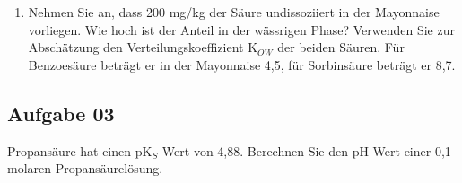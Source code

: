 \documentclass[a4paper,11pt]{article}
\newif\ifshowme
\begin{document}
\begin{enumerate}[label=\alph*)]
{}
\else
\fi

\item Nehmen Sie an, dass 200 mg/kg der Säure undissoziiert in der Mayonnaise vorliegen.
Wie hoch ist der Anteil in der wässrigen Phase? Verwenden Sie zur Abschätzung den
Verteilungskoeffizient K$_{OW}$ der beiden Säuren. Für Benzoesäure beträgt er in der
Mayonnaise 4,5, für Sorbinsäure beträgt er 8,7.

\ifshowme
\antwort{
Gibt man einen Stoff in ein System zweier nicht mischbarer Phasen, so verteilt er sich durch Diffusion,
bis sich ein Gleichgewicht eingestellt hat. Das Gleichgewicht wird durch den Nernst’schen
Verteilungskoeffizienten beschrieben:
\boxfr{
\begin{align*}
K_N = \frac{c_{p1}}{c_{p2}}
\end{align*}
}
\pp
\begin{align*}
K= 4,5 &= \frac{\frac{200~\text{mg}-x}{350}}{\frac{x}{650~\text{g}}} \\
4,5 &= \frac{200~\text{mg}-x}{350~\text{g}} \cdot \frac{650~\text{g}}{x}  \\
4,5 &= \frac{650}{350} \cdot (\frac{200~\text{mg}}{x}-1) \\ 
4,5 \cdot \frac{350}{650} &= \frac{200~\text{mg}}{x} -1 \\
(4,5 \cdot \frac{350}{650}+1) &= \frac{200~\text{mg}}{x} \\
\frac{1}{4,5 \cdot \frac{350}{650} + 1} \cdot 200 ~\text{mg} &= x  \\
x &= 58,43  ~\text{mg}
\end{align*}

Bei gleicher Verfahrensweise erhält man für \textbf{Sorbinsäure} (Verteilungskoeffizient = 8,7) einen Anteil von 35 mg in der wässrigen Phase
}
\else
\fi



\end{enumerate}
\subsection*{Aufgabe 03}
Propansäure hat einen pK$_S$-Wert von 4,88. Berechnen Sie den pH-Wert einer 0,1 molaren
Propansäurelösung.

\ifshowme
\antwort{
Formel für schwache Säuren:
\begin{align*}
pH &= \frac{1}{2} \cdot (pK_S - \log(c)) \\
pH &= \frac{1}{2} \cdot (4,88 - \log(0,1)) = 2,9
\end{align*}


}
\else
\fi
\end{document}
